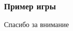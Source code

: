 \documentclass{beamer}
\begin{document}
  
  \begin{frame}
    \frametitle{Пример игры}
  
  \end{frame}
  

  \begin{frame}
  \Huge{\centerline{Спасибо за внимание}}
  \end{frame}
  
  
  
\end{document}
